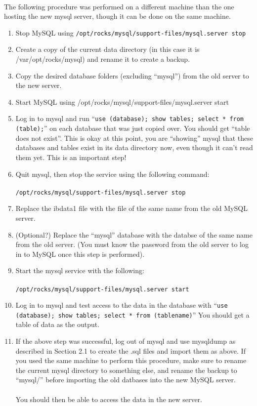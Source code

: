\documentclass[12pt]{article}
\begin{document}
\paragraph{} The following procedure was performed on a different machine than the one hosting the new mysql server, though it can be done on the same machine.
\begin{enumerate}
\item Stop MySQL using {\tt /opt/rocks/mysql/support-files/mysql.server stop}
\item Create a copy of the current data directory (in this case it is /var/opt/rocks/mysql) and rename it to create a backup. 
\item Copy the desired database folders (excluding ``mysql'') from the old server to the new server.
\item Start MySQL using /opt/rocks/mysql/support-files/mysql.server start
\item Log in to mysql and run ``{\tt use (database); show tables; select * from (table);}'' on each database that was just copied over. You should get ``table does not exist''. This is okay at this point, you are ``showing'' mysql that these databases and tables exist in its data directory now, even though it can't read them yet. This is an important step! 
\item Quit mysql, then stop the service using the following command:
  \paragraph{} {\tt /opt/rocks/mysql/support-files/mysql.server stop}
\item Replace the ibdata1 file with the file of the same name from the old MySQL server.
\item (Optional?) Replace the ``mysql'' database with the databse of the same name from the old server. (You must know the password from the old server to log in to MySQL once this step is performed). 
\item Start the mysql service with the following:
  \paragraph{} {\tt /opt/rocks/mysql/support-files/mysql.server start}
\item Log in to mysql and test access to the data in the database with ``{\tt use (database); show tables; select * from (tablename)}'' You should get a table of data as the output.
\item If the above step was successful, log out of mysql and use mysqldump as described in Section 2.1 to create the .sql files and import them as above. If you used the same machine to perform this procedure, make sure to rename the current mysql directory to something else, and rename the backup to ``mysql/'' before importing the old datbases into the new MySQL server.
\paragraph{} You should then be able to access the data in the new server.
\end{enumerate}
\end{document}
